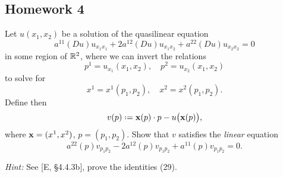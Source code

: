 \subsection{Homework 4}
\begin{problem}
  Let \(u(x_1,x_2)\) be a solution of the quasilinear equation
  \[
    a^{11}(Du)u_{x_1x_1}+ 2a^{12}(Du)u_{x_1x_2}+a^{22}(Du)u_{x_2x_2}=0
  \]
  in some region of \(\mathbb{R}^2\), where we can invert the relations
  \[
    p^1=u_{x_1}(x_1,x_2),\quad p^2=u_{x_2}(x_1,x_2)
  \]
  to solve for
  \[
    x^1=x^1(p_1,p_2),\quad x^2=x^2(p_1,p_2).
  \]
  Define then
  \[
    v(p)\defeq \bfx(p)\cdot p-u\bigl(\bfx(p)\bigr),
  \]
  where \(\mathbf{x}=(x^1,x^2)\), \(p=(p_1,p_2)\). Show that \(v\) satisfies the
  \emph{linear} equation
  \[
    a^{22}(p)v_{p_1p_2}-2a^{12}(p)v_{p_1p_2}+a^{11}(p)v_{p_1p_2}=0.
  \]

  \noindent\emph{Hint:} See [E, \S 4.4.3b], prove the identities (29).
\end{problem}
